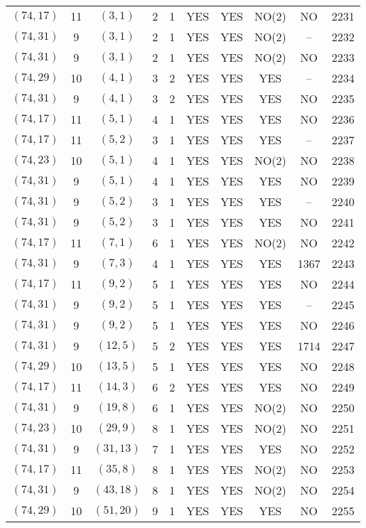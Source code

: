 \begin{longtable}{|c|c|c|c|c|c|c|c|c|c|}
$(74, 17)$ & 11 & $(3, 1)$ & 2 & 1 & YES & YES & NO(2) & NO & 2231\\
$(74, 31)$ & 9 & $(3, 1)$ & 2 & 1 & YES & YES & NO(2) & -- & 2232\\
$(74, 31)$ & 9 & $(3, 1)$ & 2 & 1 & YES & YES & NO(2) & NO & 2233\\
$(74, 29)$ & 10 & $(4, 1)$ & 3 & 2 & YES & YES & YES & -- & 2234\\
$(74, 31)$ & 9 & $(4, 1)$ & 3 & 2 & YES & YES & YES & NO & 2235\\
$(74, 17)$ & 11 & $(5, 1)$ & 4 & 1 & YES & YES & YES & NO & 2236\\
$(74, 17)$ & 11 & $(5, 2)$ & 3 & 1 & YES & YES & YES & -- & 2237\\
$(74, 23)$ & 10 & $(5, 1)$ & 4 & 1 & YES & YES & NO(2) & NO & 2238\\
$(74, 31)$ & 9 & $(5, 1)$ & 4 & 1 & YES & YES & YES & NO & 2239\\
$(74, 31)$ & 9 & $(5, 2)$ & 3 & 1 & YES & YES & YES & -- & 2240\\
$(74, 31)$ & 9 & $(5, 2)$ & 3 & 1 & YES & YES & YES & NO & 2241\\
$(74, 17)$ & 11 & $(7, 1)$ & 6 & 1 & YES & YES & NO(2) & NO & 2242\\
$(74, 31)$ & 9 & $(7, 3)$ & 4 & 1 & YES & YES & YES & 1367 & 2243\\
$(74, 17)$ & 11 & $(9, 2)$ & 5 & 1 & YES & YES & YES & NO & 2244\\
$(74, 31)$ & 9 & $(9, 2)$ & 5 & 1 & YES & YES & YES & -- & 2245\\
$(74, 31)$ & 9 & $(9, 2)$ & 5 & 1 & YES & YES & YES & NO & 2246\\
$(74, 31)$ & 9 & $(12, 5)$ & 5 & 2 & YES & YES & YES & 1714 & 2247\\
$(74, 29)$ & 10 & $(13, 5)$ & 5 & 1 & YES & YES & YES & NO & 2248\\
$(74, 17)$ & 11 & $(14, 3)$ & 6 & 2 & YES & YES & YES & NO & 2249\\
$(74, 31)$ & 9 & $(19, 8)$ & 6 & 1 & YES & YES & NO(2) & NO & 2250\\
$(74, 23)$ & 10 & $(29, 9)$ & 8 & 1 & YES & YES & NO(2) & NO & 2251\\
$(74, 31)$ & 9 & $(31, 13)$ & 7 & 1 & YES & YES & YES & NO & 2252\\
$(74, 17)$ & 11 & $(35, 8)$ & 8 & 1 & YES & YES & NO(2) & NO & 2253\\
$(74, 31)$ & 9 & $(43, 18)$ & 8 & 1 & YES & YES & NO(2) & NO & 2254\\
$(74, 29)$ & 10 & $(51, 20)$ & 9 & 1 & YES & YES & YES & NO & 2255\\

\end{longtable}

